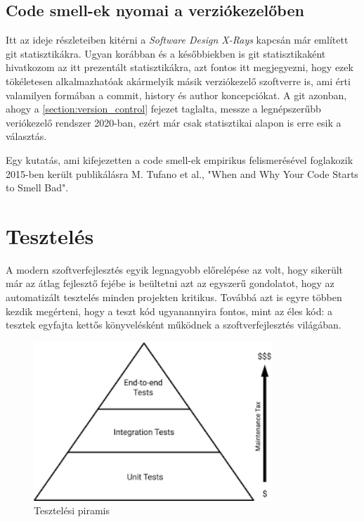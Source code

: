\subsection{Code smell-ek nyomai a verziókezelőben}

Itt az ideje részleteiben kitérni a \textit{Software Design X-Rays}\cite{tornhillXrays} kapcsán már említett git statisztikákra. Ugyan korábban és a későbbiekben is git statisztikaként hivatkozom az itt prezentált statisztikákra, azt fontos itt megjegyezni, hogy ezek tökéletesen alkalmazhatóak akármelyik másik verziókezelő szoftverre is, ami érti valamilyen formában a commit, history és author koncepciókat. A git azonban, ahogy a \ref{section:version_control} fejezet taglalta, messze a legnépszerűbb veriókezelő rendszer 2020-ban, ezért már csak statisztikai alapon is erre esik a választás.

Egy kutatás, ami kifejezetten a code smell-ek empirikus felismerésével foglakozik 2015-ben került publikálásra M. Tufano et al., "When and Why Your Code Starts to Smell Bad"\cite{codeSmells}.

\section{Tesztelés}

A modern szoftverfejlesztés egyik legnagyobb előrelépése az volt, hogy sikerült már az átlag fejlesztő fejébe is beültetni azt az egyszerű gondolatot, hogy az automatizált tesztelés minden projekten kritikus. Továbbá azt is egyre többen kezdik megérteni, hogy a teszt kód ugyanannyira fontos, mint az éles kód: a tesztek egyfajta kettős könyvelésként működnek a szoftverfejlesztés világában.

\begin{figure}[H]
    \centering
    \includegraphics[width=0.8\textwidth]{images/piramis.png}
    \caption{Tesztelési piramis}
    \label{fig:testing-pyramid}
\end{figure}

